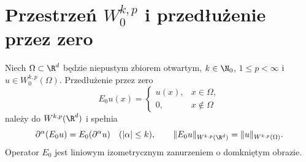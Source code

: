\section[Domknięcie funkcji testowych i przedłużenie przez zero]{Przestrzeń $W^{k,p}_0$ i przedłużenie przez zero}
\label{sec:pde9-zero}

\begin{twierdzenie}
\label{thm:pde9-zero-extension}
Niech $\Omega\subset\R^d$ będzie niepustym zbiorem otwartym,
$k\in\N_0$, $1\le p<\infty$ i $u\in W^{k,p}_0(\Omega)$.
Przedłużenie przez zero
\[
 E_0u(x)=\begin{cases}u(x),&x\in\Omega,\\0,&x\notin\Omega\end{cases}
\]
należy do $W^{k,p}(\R^d)$ i spełnia
\[
 \partial^\alpha(E_0u)=E_0(\partial^\alpha u)
 \quad (|\alpha|\le k),\qquad
 \|E_0u\|_{W^{k,p}(\R^d)}=\|u\|_{W^{k,p}(\Omega)}.
\]
Operator $E_0$ jest liniowym izometrycznym zanurzeniem
o domkniętym obrazie.
\end{twierdzenie}

